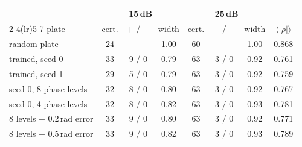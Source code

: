 \begin{tabular}{@{}l ccc ccc c@{}}\toprule
 & \multicolumn{3}{c}{15\,dB} & \multicolumn{3}{c}{25\,dB} & \\
\cmidrule(lr){2-4}\cmidrule(lr){5-7}
plate & cert. & $+$ / $-$ & width & cert. & $+$ / $-$ & width & $\langle|\rho|\rangle$\\\midrule
random plate & 24 & -- & 1.00 & 60 & -- & 1.00 & 0.868\\
trained, seed 0 & 33 & 9 / 0 & 0.79 & 63 & 3 / 0 & 0.92 & 0.761\\
trained, seed 1 & 29 & 5 / 0 & 0.79 & 63 & 3 / 0 & 0.92 & 0.759\\
seed 0, 8 phase levels & 32 & 8 / 0 & 0.80 & 63 & 3 / 0 & 0.92 & 0.767\\
seed 0, 4 phase levels & 32 & 8 / 0 & 0.82 & 63 & 3 / 0 & 0.93 & 0.781\\
8 levels + 0.2\,rad error & 33 & 9 / 0 & 0.80 & 63 & 3 / 0 & 0.92 & 0.771\\
8 levels + 0.5\,rad error & 33 & 9 / 0 & 0.82 & 63 & 3 / 0 & 0.93 & 0.789\\
\bottomrule\end{tabular}
